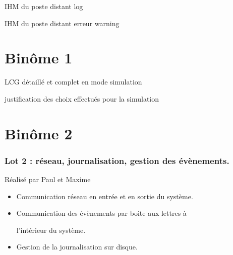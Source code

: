 \documentclass{beamer}
\begin{document}
	\begin{frame}
		IHM du poste distant
		log
	\end{frame}

	\begin{frame}
		IHM du poste distant
		erreur \/ warning
	\end{frame}

\section{Binôme 1}
	\begin{frame}
		LCG détaillé et complet en mode simulation
	\end{frame}

	\begin{frame}
		justification des choix effectués pour la simulation 
	\end{frame}

\section{Binôme 2}
	\begin{frame}

	\frametitle{Lot 2 : réseau, journalisation, gestion des évènements.}

	    \begin{block}{Réalisé par Paul et Maxime}

	  \begin{itemize}

	      \item   Communication réseau en entrée et en sortie du système.

	      \item   Communication des évènements par boite aux lettres à

	      l'intérieur du système.

	      \item   Gestion de la journalisation sur disque.

	  \end{itemize}

	    \end{block}

	\end{frame}

	
\end{document}
